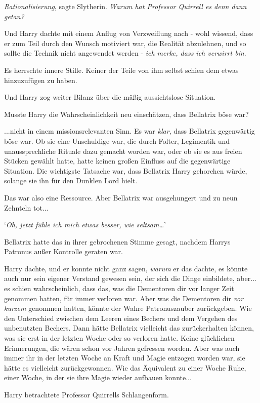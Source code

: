 {\emph{Rationalisierung}, sagte Slytherin. \emph{Warum hat Professor Quirrell es denn dann getan?}

Und Harry dachte mit einem Anflug von Verzweiflung nach - wohl wissend, dass er zum Teil durch den Wunsch motiviert war, die Realität abzulehnen, und so sollte die Technik nicht angewendet werden - \emph{ich merke, dass ich verwirrt bin}.

Es herrschte innere Stille. Keiner der Teile von ihm selbst schien dem etwas hinzuzufügen zu haben.

Und Harry zog weiter Bilanz über die mäßig aussichtslose Situation.

Musste Harry die Wahrscheinlichkeit neu einschätzen, dass Bellatrix böse war?

...nicht in einem missionsrelevanten Sinn. Es war \emph{klar}, dass Bellatrix gegenwärtig böse war. Ob sie eine Unschuldige war, die durch Folter, Legimentik und unaussprechliche Rituale dazu gemacht worden war, oder ob sie es aus freien Stücken gewählt hatte, hatte keinen großen Einfluss auf die gegenwärtige Situation. Die wichtigste Tatsache war, dass Bellatrix Harry gehorchen würde, solange sie ihn für den Dunklen Lord hielt.

Das war also eine Ressource. Aber Bellatrix war ausgehungert und zu neun Zehnteln tot...

`\emph{Oh, jetzt fühle ich mich etwas besser, wie seltsam…}'

Bellatrix hatte das in ihrer gebrochenen Stimme gesagt, nachdem Harrys Patronus außer Kontrolle geraten war.

Harry dachte, und er konnte nicht ganz sagen, \emph{warum} er das dachte, es könnte auch nur sein eigener Verstand gewesen sein, der sich die Dinge einbildete, aber... es schien wahrscheinlich, dass das, was die Dementoren dir vor langer Zeit genommen hatten, für immer verloren war. Aber was die Dementoren dir \emph{vor kurzem} genommen hatten, könnte der Wahre Patronuszauber zurückgeben. Wie den Unterschied zwischen dem Leeren eines Bechers und dem Vergehen des unbenutzten Bechers. Dann hätte Bellatrix vielleicht das zurückerhalten können, was sie erst in der letzten Woche oder so verloren hatte. Keine glücklichen Erinnerungen, die wären schon vor Jahren gefressen worden. Aber was auch immer ihr in der letzten Woche an Kraft und Magie entzogen worden war, sie hätte es vielleicht zurückgewonnen. Wie das Äquivalent zu einer Woche Ruhe, einer Woche, in der sie ihre Magie wieder aufbauen konnte...

Harry betrachtete Professor Quirrells Schlangenform.

}
